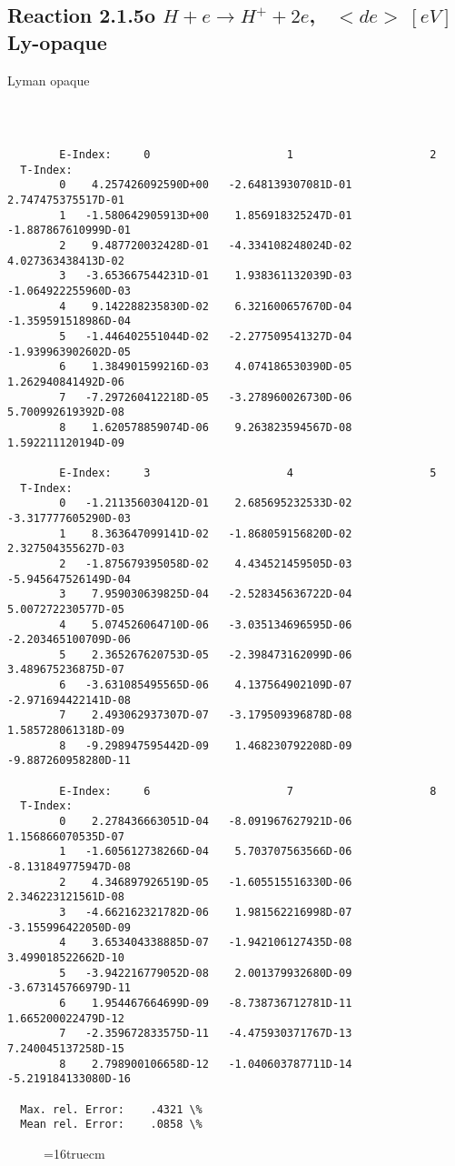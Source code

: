 \documentclass[12pt,dvipdfmx]{article}
\begin{document}
\subsection{
Reaction 2.1.5o  $ H + e \rightarrow H^+ + 2e    $, \   $<de> \ [eV]$ Ly-opaque}

Lyman opaque

\begin{small}\begin{verbatim}



        E-Index:     0                     1                     2
  T-Index:
        0    4.257426092590D+00   -2.648139307081D-01    2.747475375517D-01
        1   -1.580642905913D+00    1.856918325247D-01   -1.887867610999D-01
        2    9.487720032428D-01   -4.334108248024D-02    4.027363438413D-02
        3   -3.653667544231D-01    1.938361132039D-03   -1.064922255960D-03
        4    9.142288235830D-02    6.321600657670D-04   -1.359591518986D-04
        5   -1.446402551044D-02   -2.277509541327D-04   -1.939963902602D-05
        6    1.384901599216D-03    4.074186530390D-05    1.262940841492D-06
        7   -7.297260412218D-05   -3.278960026730D-06    5.700992619392D-08
        8    1.620578859074D-06    9.263823594567D-08    1.592211120194D-09

        E-Index:     3                     4                     5
  T-Index:
        0   -1.211356030412D-01    2.685695232533D-02   -3.317777605290D-03
        1    8.363647099141D-02   -1.868059156820D-02    2.327504355627D-03
        2   -1.875679395058D-02    4.434521459505D-03   -5.945647526149D-04
        3    7.959030639825D-04   -2.528345636722D-04    5.007272230577D-05
        4    5.074526064710D-06   -3.035134696595D-06   -2.203465100709D-06
        5    2.365267620753D-05   -2.398473162099D-06    3.489675236875D-07
        6   -3.631085495565D-06    4.137564902109D-07   -2.971694422141D-08
        7    2.493062937307D-07   -3.179509396878D-08    1.585728061318D-09
        8   -9.298947595442D-09    1.468230792208D-09   -9.887260958280D-11

        E-Index:     6                     7                     8
  T-Index:
        0    2.278436663051D-04   -8.091967627921D-06    1.156866070535D-07
        1   -1.605612738266D-04    5.703707563566D-06   -8.131849775947D-08
        2    4.346897926519D-05   -1.605515516330D-06    2.346223121561D-08
        3   -4.662162321782D-06    1.981562216998D-07   -3.155996422050D-09
        4    3.653404338885D-07   -1.942106127435D-08    3.499018522662D-10
        5   -3.942216779052D-08    2.001379932680D-09   -3.673145766979D-11
        6    1.954467664699D-09   -8.738736712781D-11    1.665200022479D-12
        7   -2.359672833575D-11   -4.475930371767D-13    7.240045137258D-15
        8    2.798900106658D-12   -1.040603787711D-14   -5.219184133080D-16

  Max. rel. Error:    .4321 \%
  Mean rel. Error:    .0858 \%

\end{verbatim}\end{small}
\begin{figure} \label{2.1.5li2o}
\epsfxsize=16truecm
\end{figure}
\newpage
\end{document}
